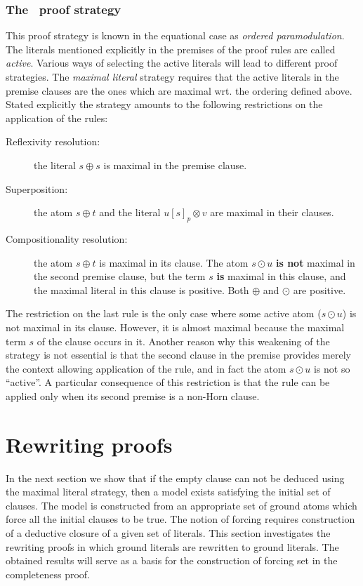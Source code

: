 \subsubsection{The \strategy\ proof strategy}\label{sub:Max}
This proof strategy is known in the equational case as {\em ordered
paramodulation}.
The literals
mentioned explicitly in the premises of the proof rules are called
{\em active}. Various ways of selecting the active
literals will lead to
different proof strategies. The {\em maximal literal} strategy
requires that the active
literals in the premise clauses are the ones
which are maximal wrt. the ordering defined above.
Stated explicitly the strategy amounts
to the following restrictions on the application of the rules:
\begin{description} %
\item[Reflexivity resolution:] the literal \(s\oplus s\) is maximal 
in the premise clause.
\item [Superposition:]
the atom \(s\oplus t\) and the literal \(u[s]_p\otimes v\)
are maximal in their clauses.
\item [Compositionality resolution:] the atom \(s\oplus t\) is maximal
in its clause. The atom \(s\odot u\) {\bf is not} maximal in 
the second premise clause,
but the term $s$ {\bf is} maximal in this clause,  
and the maximal literal in this clause is positive. Both \(\oplus\) and
\(\odot\) are positive.
\end{description}
The restriction on the last rule is the only case where some active atom
($s\odot u$) is not maximal in its clause. However, it is almost
maximal because the maximal term $s$ of the clause occurs in it.  Another
reason why this weakening of the strategy is not essential is that 
the second
clause in the premise provides merely the context allowing application
of the rule, and in fact the atom $s\odot u$ is not so ``active''. 
A particular consequence of this restriction is that the rule can be applied only
when its second premise is a non-Horn clause.


\section{Rewriting proofs} \label{se:rewrite}

In the next section we show that if the empty clause can not be deduced using 
the maximal literal strategy, then a model exists satisfying the initial set of 
clauses. The model is constructed from an appropriate set of ground atoms 
which force all the initial clauses to be true. The notion of forcing requires 
construction of a deductive closure of a given set of literals. This section 
investigates the rewriting proofs in which ground literals are rewritten to 
ground literals. The obtained results will serve as a basis for the 
construction of forcing set in the completeness proof.

